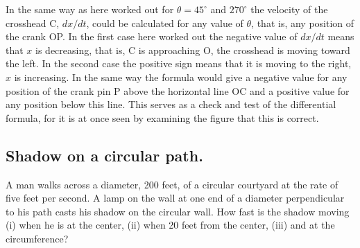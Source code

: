 In the same way as here worked out for $\theta=45^\circ$ and $270^\circ$ the velocity of the crosshead C, $dx/dt$, could be calculated for any value of $\theta$, that is, any position of the crank OP. In the first case here worked out the negative value of $dx/dt$ means that $x$ is decreasing, that is, C is approaching O, the crosshead is moving toward the left. In the second case the positive sign means that it is moving to the right, $x$ is increasing. In the same way the formula would give a negative value for any position of the crank pin P above the horizontal line OC and a positive value for any position below this line. This serves as a check and test of the differential formula, for it is at once seen by examining the figure that this is correct.

\subsection*{Shadow on a circular path.}

A man walks across a diameter, 200 feet, of a circular courtyard at the rate of five feet per second. A lamp on the wall at one end of a diameter perpendicular to his path casts his shadow on the circular wall. How fast is the shadow moving (i) when he is at the center, (ii) when 20 feet from the center, (iii) and at the circumference?

